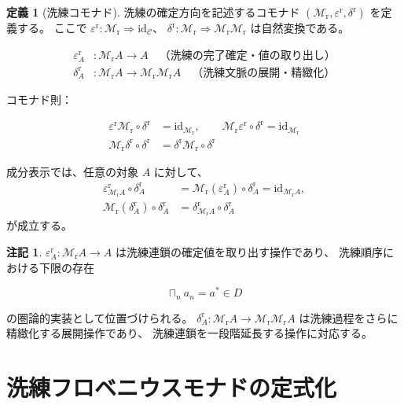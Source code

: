 \documentclass[11pt,a4paper]{article}
\theoremstyle{definition}
\newtheorem{definition}{定義}[section]
\newtheorem{remark}{注記}[section]
\newcommand{\Mr}{\mathcal{M}_{\mathrm{r}}}
\newcommand{\epsr}{\varepsilon^{\mathrm{r}}}
\newcommand{\deltar}{\delta^{\mathrm{r}}}
\newcommand{\id}{\mathrm{id}}
\DeclareMathOperator*{\bigsqcap}{\sqcap}
\begin{document}
\begin{definition}[洗練コモナド]
洗練の確定方向を記述するコモナド $(\Mr, \epsr, \deltar)$ を定義する。
ここで $\epsr: \Mr \Rightarrow \id_{\mathcal{C}}$、
$\deltar: \Mr \Rightarrow \Mr\Mr$ は自然変換である。

\begin{align}
\epsr_A &: \Mr A \to A \quad \text{（洗練の完了確定・値の取り出し）}\\
\deltar_A &: \Mr A \to \Mr\Mr A \quad \text{（洗練文脈の展開・精緻化）}
\end{align}

コモナド則：

\begin{align}
\epsr\Mr \circ \deltar &= \id_{\Mr},
\qquad
\Mr\epsr \circ \deltar = \id_{\Mr}
\label{eq:comonad1}\\
\Mr\deltar \circ \deltar &= \deltar\Mr \circ \deltar
\label{eq:comonad2}
\end{align}

成分表示では、任意の対象 $A$ に対して、
\begin{align}
\epsr_{\Mr A} \circ \deltar_A
  &= \Mr(\epsr_A) \circ \deltar_A
  = \id_{\Mr A},\\
\Mr(\deltar_A) \circ \deltar_A
  &= \deltar_{\Mr A} \circ \deltar_A
\end{align}
が成立する。
\end{definition}

\begin{remark}
$\epsr_A: \Mr A \to A$ は洗練連鎖の確定値を取り出す操作であり、
洗練順序における下限の存在

\begin{equation}
\bigsqcap_{n} a_n = a^* \in D
\end{equation}

の圏論的実装として位置づけられる。
$\deltar_A: \Mr A \to \Mr\Mr A$ は洗練過程をさらに精緻化する展開操作であり、
洗練連鎖を一段階延長する操作に対応する。
\end{remark}

\section{洗練フロベニウスモナドの定式化}
\end{document}
